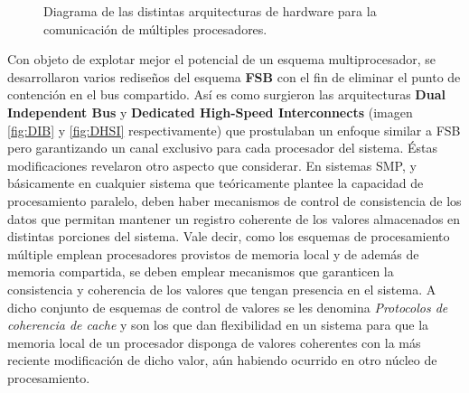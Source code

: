 \begin{figure}[th!]
\centering
{}
\caption{Diagrama de las distintas arquitecturas de hardware para la comunicación de múltiples procesadores.}
\label{fig:arquitecturas}
\end{figure}

Con objeto de explotar mejor el potencial de un esquema multiprocesador, se desarrollaron varios rediseños del esquema \textbf{FSB} con el fin de eliminar el punto de contención en el bus compartido. Así es como surgieron las arquitecturas \textbf{Dual Independent Bus} y \textbf{Dedicated High-Speed Interconnects} (imagen \ref{fig:DIB} y \ref{fig:DHSI} respectivamente) que prostulaban un enfoque similar a FSB pero garantizando un canal exclusivo para cada procesador del sistema. Éstas modificaciones revelaron otro aspecto que considerar. En sistemas SMP, y básicamente en cualquier sistema que teóricamente plantee la capacidad de procesamiento paralelo, deben haber mecanismos de control de consistencia de los datos que permitan mantener un registro coherente de los valores almacenados en distintas porciones del sistema. Vale decir, como los esquemas de procesamiento múltiple emplean procesadores provistos de memoria local y de además de memoria compartida, se deben emplear mecanismos que garanticen la consistencia y coherencia de los valores que tengan presencia en el sistema. A dicho conjunto de esquemas de control de valores se les denomina \emph{Protocolos de coherencia de cache} y son los que dan flexibilidad en un sistema para que la memoria local de un procesador disponga de valores coherentes con la más reciente modificación de dicho valor, aún habiendo ocurrido en otro núcleo de procesamiento.

